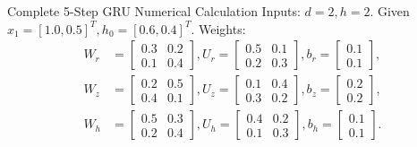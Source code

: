 \documentclass[a4paper,11pt]{article}
\begin{document}
\begin{worked}{Complete 5-Step GRU Numerical Calculation}
Inputs: $d=2, h=2$. Given $x_1 = [1.0, 0.5]^T, h_0 = [0.6, 0.4]^T$.
Weights:
\begin{align*}
W_r &= \begin{bmatrix} 0.3 & 0.2 \\ 0.1 & 0.4 \end{bmatrix}, U_r = \begin{bmatrix} 0.5 & 0.1 \\ 0.2 & 0.3 \end{bmatrix}, b_r = \begin{bmatrix} 0.1 \\ 0.1 \end{bmatrix}, \\
W_z &= \begin{bmatrix} 0.2 & 0.5 \\ 0.4 & 0.1 \end{bmatrix}, U_z = \begin{bmatrix} 0.1 & 0.4 \\ 0.3 & 0.2 \end{bmatrix}, b_z = \begin{bmatrix} 0.2 \\ 0.2 \end{bmatrix}, \\
W_h &= \begin{bmatrix} 0.5 & 0.3 \\ 0.2 & 0.4 \end{bmatrix}, U_h = \begin{bmatrix} 0.4 & 0.2 \\ 0.1 & 0.3 \end{bmatrix}, b_h = \begin{bmatrix} 0.1 \\ 0.1 \end{bmatrix}.
\end{align*}


\end{worked}
\end{document}
